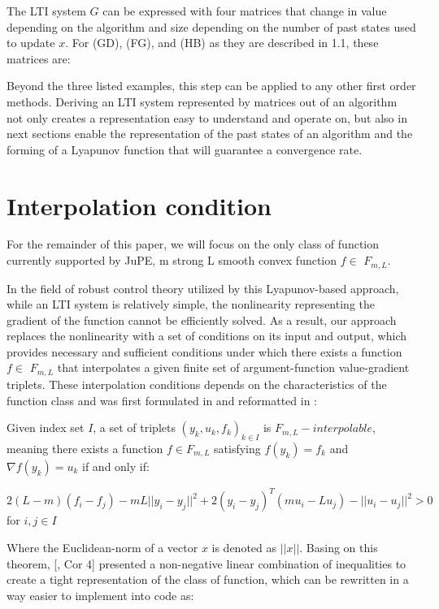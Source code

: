 The LTI system \(G\) can be expressed with four matrices that change in value depending on the algorithm and size depending on the number of past states used to update \(x\). For (GD), (FG), and (HB) as they are described in 1.1, these matrices are:

Beyond the three listed examples, this step can be applied to any other first order methods. Deriving an LTI system represented by matrices out of an algorithm not only creates a representation easy to understand and operate on, but also in next sections enable the representation of the past states of an algorithm and the forming of a Lyapunov function that will guarantee a convergence rate.

\section{Interpolation condition}

For the remainder of this paper, we will focus on the only class of function currently supported by JuPE, m strong L smooth convex function \(f \in \) \(F_{m,L}\).

In the field of robust control theory utilized by this Lyapunov-based approach, while an LTI system is relatively simple, the nonlinearity representing the gradient of the function cannot be efficiently solved. As a result, our approach replaces the nonlinearity with a set of conditions on its input and output, which provides necessary and sufficient conditions under which there exists a function \(f \in \) \(F_{m,L}\) that interpolates a given finite set of argument-function value-gradient triplets. These interpolation conditions depends on the characteristics of the function class and was first formulated in \cite{taylor2016} and reformatted in \cite{tutorial}:

\begin{theorem}
	\label{thm:interpolation_condition}
	Given index set \(I\), a set of triplets \({(y_k, u_k, f_k)}_{k \in I}\) is \(F_{m,L}-interpolable\), meaning there exists a function \(f \in F_{m,L}\) satisfying \(f(y_k) = f_k\) and \(\nabla f(y_k) = u_k\) if and only if:

	\(2(L-m)(f_i - f_j) - mL||y_i - y_j||^2 + 2(y_i - y_j)^{T}(mu_i - Lu_j) - ||u_i - u_j||^2 > 0\) for \(i ,j \in I\)

\end{theorem}

Where the Euclidean-norm of a vector \(x\) is denoted as \(||x||\). Basing on this theorem, [\cite{tutorial}, Cor 4] presented a non-negative linear combination of inequalities to create a tight representation of the class of function, which can be rewritten in a way easier to implement into code as:

